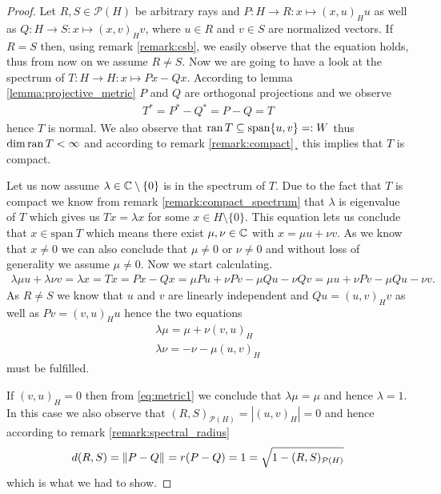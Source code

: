 \begin{proof}
	Let $R,S \in\mathcal{P}(H)$ be arbitrary rays and $P: H \to R: x \mapsto (x, u)_H u$ as well as $Q: H \to S: x \mapsto (x, v)_H v$, where $u \in R$ and $v \in S$ are normalized vectors. If $R = S$ then, using remark \ref{remark:csb}, we easily observe that the equation holds, thus from now on we assume $R \neq S$. Now we are going to have a look at the spectrum of $T: H \to H: x  \mapsto Px - Qx$. According to lemma \ref{lemma:projective_metric} $P$ and $Q$ are orthogonal projections and we observe
	\begin{align*}
		T^\ast = P^\ast - Q^\ast = P - Q = T
	\end{align*}
	hence $T$ is normal. We also observe that $\operatorname{ran} T \subseteq \mathrm{span}\{u, v\} =: W$ thus $\dim \operatorname{ran} T < \infty$ and according to remark \ref{remark:compact}¸ this implies that $T$ is compact.
	
	Let us now assume $\lambda \in \mathbb{C} \setminus \{0\}$ is in the spectrum of $T$. Due to the fact that $T$ is compact we know from remark \ref{remark:compact_spectrum} that $\lambda$ is eigenvalue of $T$ which gives us $T x = \lambda x$ for some $x \in H \setminus \{0\}$. This equation lets us conclude that $x \in \mathrm{span 
	}\ T$ which means there exist $\mu, \nu \in \mathbb{C}$ with $x = \mu u + \nu v$. As we know that $x \neq 0$ we can also conclude that $\mu \neq 0$ or $\nu \neq 0$ and without loss of generality we assume $\mu \neq 0$. Now we start calculating.
	\begin{align*}
		\lambda \mu u + \lambda \nu v = \lambda x = Tx = Px - Qx = \mu Pu + \nu Pv - \mu Qu - \nu Qv = \mu u + \nu Pv - \mu Qu - \nu v .
	\end{align*}
	As $R \neq S$ we know that $u$ and $v$ are linearly independent and $Qu = (u,v)_H v$ as well as $Pv = (v,u)_H u$ hence the two equations
	\begin{align}
		\lambda \mu  = \mu  + \nu (v,u)_H \label{eq:metric1}\\
		 \lambda \nu  = - \nu  - \mu (u,v)_H \label{eq:metric2}
	\end{align}
	must be fulfilled. 
	
	If $(v,u)_H = 0$ then from \eqref{eq:metric1} we conclude that $\lambda \mu = \mu$ and hence $\lambda = 1$. In this case we also observe that $(R,S)_{\mathcal{P}(H)} = |(u,v)_H| = 0$ and hence according to remark \ref{remark:spectral_radius}
	\begin{align*}
		d(R,S) = {\left \| P - Q \right \|}_{} = r(P - Q) = 1 = \sqrt{1 - (R,S)_{\mathcal{P}(H)}}
	\end{align*}
	which is what we had to show.
	

\end{proof}
